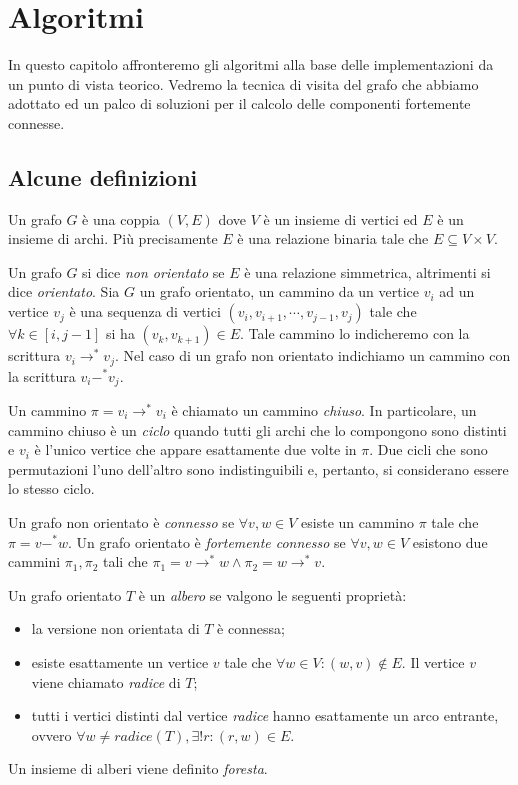 \chapter{Algoritmi}
\label{chapter:theoretical-background}
In questo capitolo affronteremo gli algoritmi alla base delle
implementazioni da un punto di vista teorico. Vedremo la tecnica di
visita del grafo che abbiamo adottato ed un palco di soluzioni per il
calcolo delle componenti fortemente connesse.

\section{Alcune definizioni}
\label{subsection:some-definitions}
Un grafo $G$ \`e una coppia $(V, E)$ dove $V$ \`e un insieme di
vertici ed $E$ \`e un insieme di archi. Pi\`u precisamente $E$ \`e una
relazione binaria tale che $E \subseteq V \times V$.

Un grafo $G$ si dice \emph{non orientato} se $E$ \`e una relazione
simmetrica, altrimenti si dice \emph{orientato}. Sia $G$ un grafo
orientato, un cammino da un vertice $v_{i}$ ad un vertice $v_{j}$ \`e
una sequenza di vertici $(v_{i}, v_{i+1}, \cdots, v_{j-1}, v_{j})$
tale che $\forall k \in [i, j-1]$ si ha $(v_{k},v_{k+1}) \in E$. Tale
cammino lo indicheremo con la scrittura $v_{i} \rightarrow^{*}
v_{j}$. Nel caso di un grafo non orientato indichiamo un cammino con
la scrittura $v_{i} -^{*} v_{j}$.

Un cammino $\pi = v_{i} \rightarrow^{*} v_{i}$ \`e chiamato un cammino
\emph{chiuso}. In particolare, un cammino chiuso \`e un \emph{ciclo}
quando tutti gli archi che lo compongono sono distinti e $v_{i}$ \`e
l'unico vertice che appare esattamente due volte in $\pi$. Due cicli
che sono permutazioni l'uno dell'altro sono indistinguibili e,
pertanto, si considerano essere lo stesso ciclo.

Un grafo non orientato \`e \emph{connesso} se $\forall v, w \in V$
esiste un cammino $\pi$ tale che $\pi = v -^{*} w$. Un grafo orientato
\`e \emph{fortemente connesso} se $\forall v, w \in V$ esistono due
cammini $\pi_{1}, \pi_{2}$ tali che $\pi_{1} = v \rightarrow^{*} w
\wedge \pi_{2} = w \rightarrow^{*} v$.

Un grafo orientato $T$ \`e un \emph{albero} se valgono le seguenti
propriet\`a:
\begin{itemize}
\item la versione non orientata di $T$ \`e connessa;
\item esiste esattamente un vertice $v$ tale che $\forall w \in V: (w,
  v) \not \in E$. Il vertice $v$ viene chiamato \emph{radice} di $T$;
\item tutti i vertici distinti dal vertice \emph{radice} hanno
  esattamente un arco entrante, ovvero $\forall w \not = radice(T),
  \exists!r: (r, w) \in E$.
\end{itemize}
Un insieme di alberi viene definito \emph{foresta}.  

